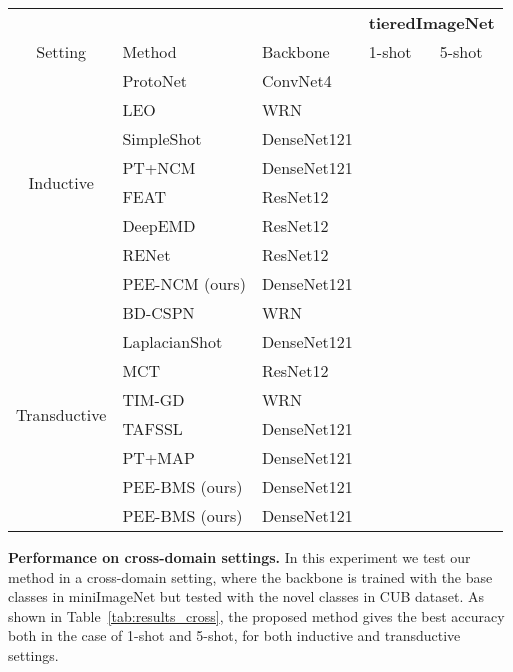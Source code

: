 \documentclass[review]{elsarticle}
\begin{document}
\begin{table*}[h!]
{\begin{tabular}{c|l|l|l|l}
         \toprule
         &  &          & \multicolumn{2}{c}{\textbf{tieredImageNet}} \\
         Setting & Method & Backbone & 1-shot & 5-shot \\       
         \midrule
         \multirow{8}{*}{Inductive}
         &ProtoNet~\cite{snell2017prototypical} & ConvNet4 &  & \\
&LEO~\cite{DBLP:conf/iclr/RusuRSVPOH19} & WRN &  & \\
         &SimpleShot~\cite{DBLP:journals/corr/abs-1911-04623} & DenseNet121 &  & \\
         &PT+NCM~\cite{hu2021leveraging} & DenseNet121 &  & \\ 
         &FEAT\cite{ye2020few} & ResNet12 &  & \\
         &DeepEMD\cite{zhang2020deepemd} & ResNet12 &  & \\
         &RENet\cite{DBLP:journals/corr/abs-2108-09666} & ResNet12 &  & \\
         &PEE-NCM (ours) & DenseNet121 &  &  \\
         \midrule
         \multirow{8}{*}{Transductive}
         &BD-CSPN~\cite{liu2020prototype} & WRN &  & \\
         &LaplacianShot~\cite{ziko2020laplacian} & DenseNet121 &  & \\
         &MCT~\cite{DBLP:journals/corr/abs-2002-12017} & ResNet12 &  & \\
         &TIM-GD~\cite{DBLP:journals/corr/abs-2008-11297} & WRN &  & \\
         &TAFSSL~\cite{lichtenstein2020tafssl} & DenseNet121 &  & \\
         &PT+MAP~\cite{hu2021leveraging} & DenseNet121 &  & \\ 
         &PEE-BMS (ours) & DenseNet121 &  & \\
         &PEE-BMS (ours) & DenseNet121 &  & \\
         \bottomrule
         
    \end{tabular}
    }
    \label{tab:results1}
\end{table*}

\textbf{Performance on cross-domain settings.} In this experiment we test our method in a cross-domain setting, where the backbone is trained with the base classes in miniImageNet but tested with the novel classes in CUB dataset. As shown in Table~\ref{tab:results_cross}, the proposed method gives the best accuracy both in the case of 1-shot and 5-shot, for both inductive and transductive settings.
\end{document}
